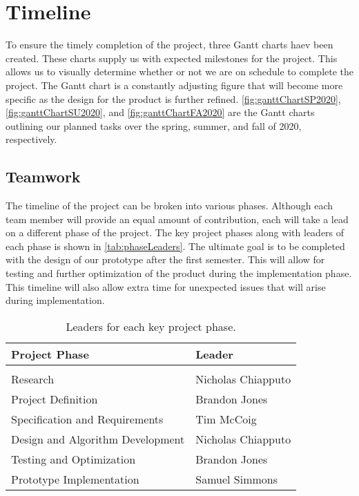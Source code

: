 \documentclass[11pt]{IEEEtran}
\begin{document}
	\section{Timeline}
		To ensure the timely completion of the project, three Gantt charts haev been created. These charts supply us with expected milestones for the project. This allows us to visually determine whether or not we are on schedule to complete the project. The Gantt chart is a constantly adjusting figure that will become more specific as the design for the product is further refined. \autoref{fig:ganttChartSP2020}, \autoref{fig:ganttChartSU2020}, and \autoref{fig:ganttChartFA2020} are the Gantt charts outlining our planned tasks over the spring, summer, and fall of 2020, respectively. 

		\subsection{Teamwork}
			The timeline of the project can be broken into various phases. Although each team member will provide an equal amount of contribution, each will take a lead on a different phase of the project. The key project phases along with leaders of each phase is shown in \autoref{tab:phaseLeaders}. The ultimate goal is to be completed with the design of our prototype after the first semester. This will allow for testing and further optimization of the product during the implementation phase. This timeline will also allow extra time for unexpected issues that will arise during implementation. 

			\begin{table}[tb]
				\centering
				\begin{tabularx}{\linewidth}{l|l}
					Project Phase 						& Leader \\
					\hline
					\vspace{-0.1in}						& \\
					Research 							& Nicholas Chiapputo \\
					Project Definition					& Brandon Jones \\
					Specification and Requirements 		& Tim McCoig \\
					Design and Algorithm Development 	& Nicholas Chiapputo \\
					Testing and Optimization 			& Brandon Jones \\
					Prototype Implementation 			& Samuel Simmons
				\end{tabularx}
				\caption{Leaders for each key project phase.}
				\label{tab:phaseLeaders}
			\end{table}
\end{document}
